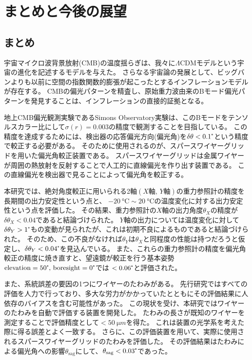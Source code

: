 \documentclass[../../main.tex]{subfiles}
\begin{document}
\chapter{まとめと今後の展望}
\section{まとめ}
宇宙マイクロ波背景放射(CMB)の温度揺らぎは、我々に$\Lambda \mathrm{CDM}$モデルという宇宙の進化を記述するモデルを与えた。
さらなる宇宙論の発展として、ビッグバンよりも以前に空間の指数関数的膨張が起こったとするインフレーションモデルが存在する。
CMBの偏光パターンを精査し、原始重力波由来のBモード偏光パターンを発見することは、インフレーションの直接的証拠となる。

地上CMB偏光観測実験であるSimons Observatory実験は、このBモードをテンソルスカラー比にして$\sigma(r)=0.003$の精度で観測することを目指している。
この精度を達成するためには、検出器の応答偏光方向(偏光角)を$\delta\theta<0.1\tcdegree$という精度で較正する必要がある。
そのために使用されるのが、スパースワイヤーグリッドを用いた偏光角較正装置である。
スパースワイヤーグリッドは金属ワイヤーが周囲の熱放射を反射することで人工的に直線偏光を作り出す装置である。
この直線偏光を検出器で見ることによって偏光角を較正する。

本研究では、絶対角度較正に用いられる2軸$(X\text{軸},\,Y\text{軸})$の重力参照計の精度を長期間の出力安定性という点と、
$\SI{-20}{\degreeCelsius}\sim\SI{20}{\degreeCelsius}$の温度変化に対する出力安定性という点を評価した。
その結果、重力参照計の$X$軸の出力角度$\theta_{X}$の精度が$\delta\theta_{X}<0.04$であると結論づけられた。
$Y$軸の出力については温度変化に対して$\delta\theta_{Y}>1\tcdegree$もの変動が見られたが、これは初期不良によるものであると結論づけられた。
そのため、この不良がなければ$\theta_{Y}$は$\theta_{X}$と同程度の性能は持つだろうと仮定し、$\delta\theta_{Y}<0.04\tcdegree$を見込んでいる。
また、これらの重力参照計の精度を偏光角較正の精度に焼き直すと、望遠鏡が較正を行う基本姿勢$\mathrm{elevation}=50\tcdegree,\,\mathrm{boresight}=0\tcdegree$では
$<0.06\tcdegree$と評価された。

また、系統誤差の要因の1つにワイヤーのたわみがある。
先行研究ではすべての評価を人力で行っており、多大な労力がかかっていたとともにその評価結果に人依存のバイアスを含む可能性があった。
この現状を受け、本研究ではワイヤーのたわみを自動で評価する装置を開発した。
たわみの長さが既知のワイヤーを測定することで評価精度として$<\SI{50}{\micro m}$を得た。
これは装置の光学系を考えた際に得る誤差とよく一致する。
さらに、この評価装置を用いて、実際に使用されるスパースワイヤーグリッドのたわみを評価した。
その評価結果はたわみによる偏光角への影響$\theta_{\mathrm{sag}}$にして、$\theta_{\mathrm{sag}}<0.03\tcdegree$であった。
\end{document}
